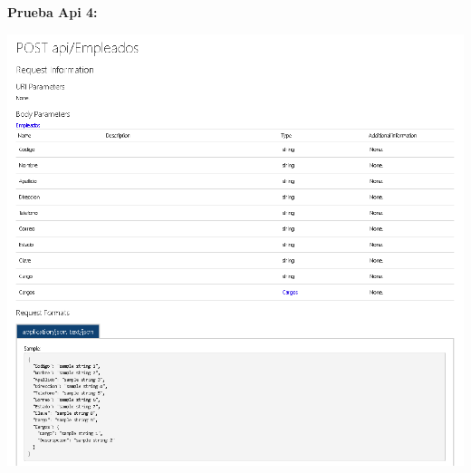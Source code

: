 \begin{flushleft}
\textbf{}\\
\textbf{}\\
\textbf{}\\
\textbf{}\\
\textbf{}\\
\textbf{}\\
\textbf{}\\
\textbf{}\\
\textbf{}\\
\textbf{}\\
\textbf{}\\
\textbf{}\\
\textbf{}\\
\textbf{}\\
\textbf{}\\
\textbf{}\\
\textbf{}\\
\textbf{}\\
\textbf{}\\
\textbf{Prueba Api 4:}\\
\begin{center}
	\includegraphics[width=19cm]{./Imagenes/api4} 
	\end{center}
\textbf{}\\
\textbf{}\\
\textbf{}\\
\textbf{}\\
\textbf{}\\

\end{flushleft}
